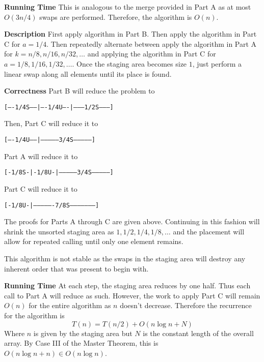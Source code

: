 \documentclass[12pt,twoside]{article}
\begin{document}
\begin{problems}
\begin{problemparts}
{\bf Running Time} This is analogous to the merge provided in Part A as at
most $O(3 n / 4)$ swaps are performed. Therefore, the algorithm is $O(n)$.

\problempart %

{\bf Description} First apply algorithm in Part B. Then apply the algorithm
in Part C for $a = 1/4$. Then repeatedly alternate between apply the
algorithm in Part A for $k = n / 8, n / 16, n / 32, \ldots$ and applying the
algorithm in Part C for $a = 1 / 8, 1 / 16, 1 / 32, \ldots$. Once the staging
area becomes size $1$, just perform a linear swap along all elements until
its place is found.

{\bf Correctness} Part B will reduce the problem to 
\begin{center}
{\tt [----1/4S-----|----1/4U----|--------1/2S--------]}
\end{center}
Then, Part C will reduce it to 
\begin{center}
{\tt [----1/4U-----|--------------3/4S---------------]}
\end{center}
Part A will reduce it to
\begin{center}
{\tt [-1/8S-|-1/8U-|--------------3/4S---------------]}
\end{center}
Part C will reduce it to
\begin{center}
{\tt [-1/8U-|----------------7/8S--------------------]}
\end{center}
The proofs for Parts A through C are given above. Continuing in this fashion
will shrink the unsorted staging area as $1, 1/2, 1/4, 1/8,\ldots$ and the
placement will allow for repeated calling until only one element remains.

This algorithm is not stable as the swaps in the staging area will destroy
any inherent order that was present to begin with.

{\bf Running Time} At each step, the staging area reduces by one half. Thus
each call to Part A will reduce as such. However, the work to apply Part C
will remain $O(n)$ for the entire algorithm as $n$ doesn't decrease.
Therefore the recurrence for the algorithm is
$$ T(n) = T(n / 2) + O(n \log n + N) $$
Where $n$ is given by the staging area but $N$ is the constant length of the
overall array. By Case III of the Master Theorem, this is $O(n \log n + n)
\in O(n \log n) $.

\end{problemparts}

\newpage
\problem  %


\end{problems}
\end{document}

